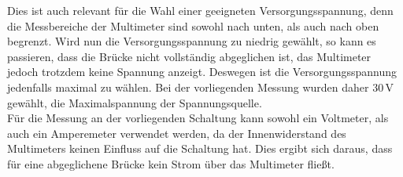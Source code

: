 Dies ist auch relevant für die Wahl einer geeigneten Versorgungsspannung, denn die Messbereiche der Multimeter sind sowohl nach unten, als auch nach oben begrenzt. Wird nun die Versorgungsspannung zu niedrig gewählt, so kann es passieren, dass die Brücke nicht vollständig abgeglichen ist, das Multimeter jedoch trotzdem keine Spannung anzeigt. Deswegen ist die Versorgungsspannung jedenfalls maximal zu wählen. Bei der vorliegenden Messung wurden daher $30\,$V gewählt, die Maximalspannung der Spannungsquelle. \\
Für die Messung an der vorliegenden Schaltung kann sowohl ein Voltmeter, als auch ein Amperemeter verwendet werden, da der Innenwiderstand des Multimeters keinen Einfluss auf die Schaltung hat. Dies ergibt sich daraus, dass für eine abgeglichene Brücke kein Strom über das Multimeter fließt.

